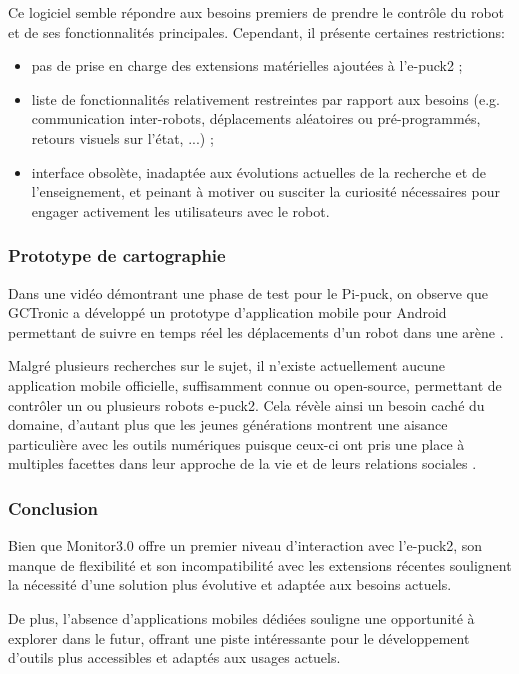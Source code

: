 Ce logiciel semble répondre aux besoins premiers de prendre le contrôle du robot et de ses fonctionnalités principales. 
Cependant, il présente certaines restrictions:
\begin{itemize}
    \item pas de prise en charge des extensions matérielles ajoutées à l'e-puck2 ;
    \item liste de fonctionnalités relativement restreintes par rapport aux besoins (e.g. communication inter-robots, déplacements aléatoires ou pré-programmés, retours visuels sur l'état, ...) ;
    \item interface obsolète, inadaptée aux évolutions actuelles de la recherche et de l’enseignement, et peinant à motiver ou susciter la curiosité nécessaires pour engager activement les utilisateurs avec le robot.
\end{itemize}

\subsubsection{Prototype de cartographie}
Dans une vidéo démontrant une phase de test pour le Pi-puck, on observe que GCTronic a développé un prototype d'application mobile pour Android permettant de suivre en temps réel les déplacements d'un robot dans une arène \autocite{gctronic_pi-puck_nodate}.

Malgré plusieurs recherches sur le sujet, il n'existe actuellement aucune application mobile officielle, suffisamment connue ou open-source, permettant de contrôler un ou plusieurs robots e-puck2.
Cela révèle ainsi un besoin caché du domaine, d'autant plus que les jeunes générations montrent une aisance particulière avec les outils numériques puisque ceux-ci ont pris une place à multiples facettes dans leur approche de la vie et de leurs relations sociales \autocite{tully_growing_2003}.

\subsubsection{Conclusion}
Bien que Monitor3.0 offre un premier niveau d'interaction avec l'e-puck2, son manque de flexibilité et son incompatibilité avec les extensions récentes soulignent la nécessité d'une solution plus évolutive et adaptée aux besoins actuels.

De plus, l'absence d'applications mobiles dédiées souligne une opportunité à explorer dans le futur, offrant une piste intéressante pour le développement d'outils plus accessibles et adaptés aux usages actuels.
